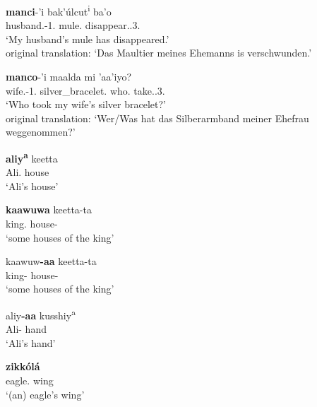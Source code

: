 \begin{exe}\ex\label{KabGen} 
\begin{xlist} 
\ex\gll \textbf{manci}-'i bak'\'ulcut\textsuperscript{i} ba'o\\
husband.\gen{}-1\sg{}.\poss{} mule.\nom{} disappear.\pfv{}.3\sg{}.\fem{}\\
\glt `My husband's mule has disappeared.'\\
 original translation: `Das Maultier meines Ehemanns is verschwunden.'

\ex\gll \textbf{manco}-'i maalda mi 'aa'iyo?\\
wife.\gen{}-1\sg{}.\poss{} silver\_bracelet.\acc{} who.\nom{} take.\pfv{}.3\sg{}.\mas{}\\
\glt `Who took my wife's silver bracelet?'\\
 original translation: `Wer/Was hat das Silberarmband meiner Ehefrau weggenommen?'
\end{xlist}
\end{exe}  


\begin{exe}\ex\label{WolGen}
\begin{xlist}
\ex\gll \textbf{aliy\textsuperscript{a}} keetta\\
Ali.\gen{} house\\
\glt `Ali's house'

\ex\gll \textbf{kaawuwa} keetta-ta\\
king.\gen{} house-\pl{}\\
\glt `some houses of the king'

\ex\gll kaawuw\textbf{-aa} keetta-ta\\
king-\gen{} house-\pl{}\\
\glt `some houses of the king'

\ex\gll aliy\textbf{-aa} kusshiy\textsuperscript{a}\\
Ali-\gen{} hand\\
\glt `Ali's hand'
\end{xlist}
\end{exe}

\enlargethispage{2\baselineskip}
\begin{exe} \ex\label{ZayGen}
\gll \textbf{zikk\'ol\'a} \\
eagle.\gen{} wing\\
\glt `(an) eagle's wing'
\end{exe}

